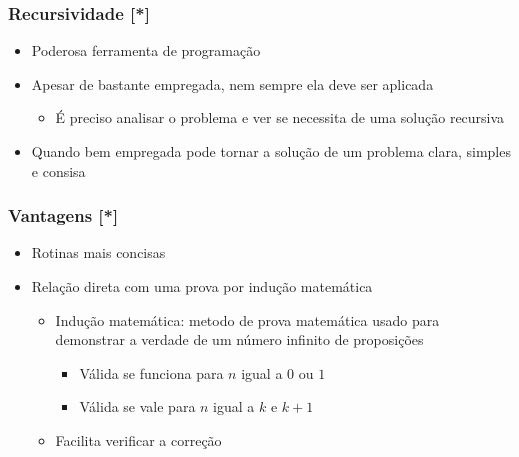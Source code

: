 \documentclass[aspectratio=169]{beamer}
\begin{document}
\begin{frame}\frametitle{Recursividade [*]}
\begin{itemize}
	\item Poderosa ferramenta de programação
	\item Apesar de bastante empregada, nem sempre ela deve ser aplicada
	\begin{itemize}
		\item É preciso analisar o problema e ver se necessita de uma solução recursiva
	\end{itemize}
	\item Quando bem empregada pode tornar a solução de um problema clara, simples e consisa
\end{itemize}
\end{frame}

\begin{frame}\frametitle{Vantagens [*]}
\begin{itemize}
	\item Rotinas mais concisas
	\item Relação direta com uma prova por indução matemática
	\begin{itemize}
		\item Indução matemática: metodo de prova matemática usado para demonstrar a verdade de um número infinito de proposições
		\begin{itemize}
			\item Válida se funciona para $n$ igual a $0$ ou $1$
			\item Válida se vale para $n$ igual a $k$ e $k + 1$
		\end{itemize}
		\item Facilita verificar a correção
	\end{itemize}
\end{itemize}
\end{frame}
\end{document}
